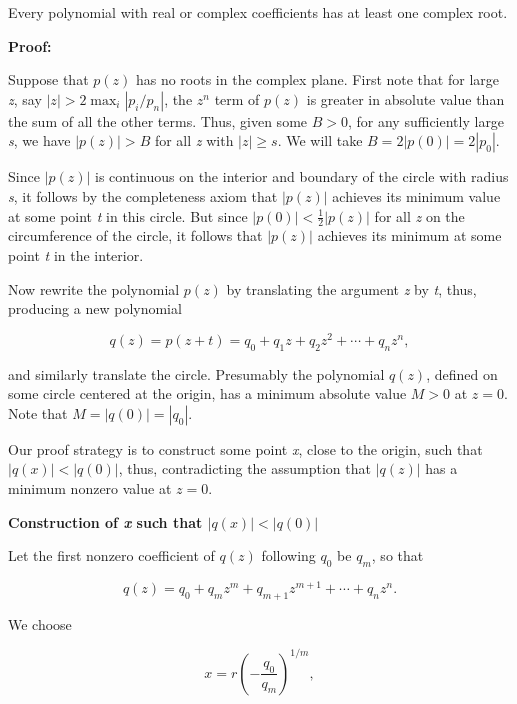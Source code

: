 Every polynomial with real or complex coefficients has at least one complex root.
\vspace{\baselineskip}

\textbf{Proof:}

Suppose that \(p(z)\) has no roots in the complex plane. First note that for large \emph{z}, say 
\(|z| > 2 \max_i |p_i/p_n|\), the \(z^n\) term of \(p(z)\) is greater in absolute 
value than the sum of all the other terms. Thus, given some \(B > 0\), for any sufficiently large \emph{s}, 
we have \(|p(z)| > B\) for all \emph{z} with \(|z| \geq s\). We will take \(B = 2|p(0)| = 2|p_0|\).
\vspace{\baselineskip}

Since \(|p(z)|\) is continuous on the interior and boundary of the circle with radius \emph{s}, it follows 
by the completeness axiom that \(|p(z)|\) achieves its minimum value at some point \emph{t} in this circle. 
But since \(|p(0)| < \frac{1}{2} |p(z)|\) for all \emph{z} on the circumference of the circle, it follows 
that \(|p(z)|\) achieves its minimum at some point \emph{t} in the interior.
\vspace{\baselineskip}

Now rewrite the polynomial \(p(z)\) by translating the argument \emph{z} by \emph{t}, thus, producing a 
new polynomial

\[
	q(z) = p(z + t) = q_0 + q_1 z + q_2 z^2 + \cdots + q_n z^n,
\]

and similarly translate the circle. Presumably the polynomial \(q(z)\), defined on some circle centered 
at the origin, has a minimum absolute value \(M > 0\) at \(z = 0\). Note that \(M = |q(0)| = |q_0|\).
\vspace{\baselineskip}

Our proof strategy is to construct some point \emph{x}, close to the origin, such that \(|q(x)| < |q(0)|\), 
thus, contradicting the assumption that \(|q(z)|\) has a minimum nonzero value at \(z = 0\).
\vspace{\baselineskip}

\textbf{Construction of \emph{x} such that \(|q(x)| < |q(0)|\)}
\vspace{\baselineskip}

Let the first nonzero coefficient of \(q(z)\) following \(q_0\) be \(q_m\), so that

\[
	q(z) = q_0 + q_m z^m + q_{m+1} z^{m+1} + \cdots + q_n z^n.
\]

We choose

\[
	x = r {\left(-\frac{q_0}{q_m}\right)}^{1/m},
\]

